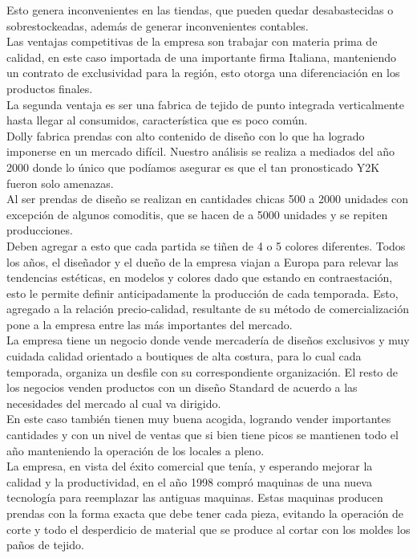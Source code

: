 \documentclass[a4paper,10pt,titlepage]{article}
\begin{document}
		\indent Esto genera inconvenientes en las tiendas, que pueden quedar desabastecidas o sobrestockeadas, adem\'as de generar inconvenientes contables.\\
		\indent Las ventajas competitivas de la empresa son trabajar con materia prima de calidad, en este caso importada de una importante firma Italiana, manteniendo un contrato de exclusividad para la regi\'on, esto otorga una diferenciaci\'on en los productos finales.\\
		\indent La segunda ventaja es ser una fabrica de tejido de punto integrada verticalmente hasta llegar al consumidos, caracter\'istica que es poco com\'un.\\
		\indent Dolly fabrica prendas con alto contenido de diseño con lo que ha logrado imponerse en un mercado dif\'icil. Nuestro an\'alisis se realiza a mediados del año 2000 donde lo \'unico que pod\'iamos asegurar es que el tan pronosticado Y2K fueron solo amenazas.\\
		\indent Al ser prendas de diseño se realizan en cantidades chicas 500 a 2000 unidades con excepci\'on de algunos comoditis, que se hacen de a 5000 unidades y se repiten producciones.\\ 
		\indent Deben agregar a esto que cada partida se tiñen de 4 o 5 colores diferentes. Todos los años, el diseñador y el dueño de la empresa viajan a Europa para relevar las tendencias est\'eticas, en modelos y colores dado que estando en contraestaci\'on, esto le permite definir anticipadamente la producci\'on de cada temporada. Esto, agregado a la relaci\'on precio-calidad, resultante de su m\'etodo de comercializaci\'on pone a la empresa entre las m\'as importantes del mercado.\\
		\indent La empresa tiene un negocio donde vende mercader\'ia de diseños exclusivos y muy cuidada calidad orientado a boutiques de alta costura, para lo cual cada temporada, organiza un desfile con su correspondiente organizaci\'on. El resto de los negocios venden productos con un diseño Standard de acuerdo a las necesidades del mercado al cual va dirigido.\\
		\indent En este caso tambi\'en tienen muy buena acogida, logrando vender importantes cantidades y con un nivel de ventas que si bien tiene picos se mantienen todo el año manteniendo la operaci\'on de los locales a pleno.\\
		\indent La empresa, en vista del \'exito comercial que ten\'ia, y esperando mejorar la calidad y la productividad, en el año 1998 compr\'o maquinas de una nueva tecnolog\'ia para reemplazar las antiguas maquinas. Estas maquinas producen prendas con la forma exacta que debe tener cada pieza, evitando la operaci\'on de corte y todo el desperdicio de material que se produce al cortar con los moldes los paños de tejido.\\
\end{document}
